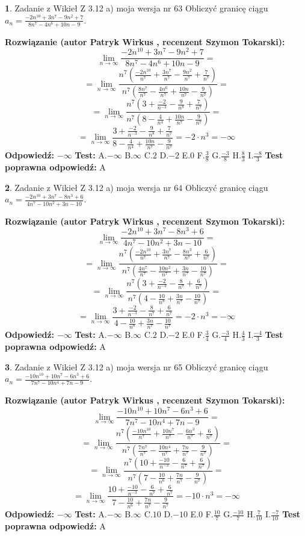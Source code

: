 \documentclass[12pt, a4paper]{article}
\theoremstyle{definition} %
\newtheorem{zad}{}
\newcommand{\zadStart}[1]{\begin{zad}#1\newline}
\newcommand{\zadStop}{\end{zad}}
\newcommand{\rozwStart}[2]{\noindent \textbf{Rozwiązanie (autor #1 , recenzent #2): }\newline}
\newcommand{\rozwStop}{\newline}
\newcommand{\odpStart}{\noindent \textbf{Odpowiedź:}\newline}
\newcommand{\odpStop}{\newline}
\newcommand{\testStart}{\noindent \textbf{Test:}\newline}
\newcommand{\testStop}{\newline}
\newcommand{\kluczStart}{\noindent \textbf{Test poprawna odpowiedź:}\newline}
\newcommand{\kluczStop}{\newline}
\begin{document}
\zadStart{Zadanie z Wikieł Z 3.12 a) moja wersja nr 63}
Obliczyć granicę ciągu $a_{n}=\frac{-2n^{10}+3n^{7}-9n^{2}+7}{8n^{7}-4n^{6}+10n-9}$.
\zadStop
\rozwStart{Patryk Wirkus}{Szymon Tokarski}
$$\lim\limits_{n\to\infty}\frac{-2n^{10}+3n^{7}-9n^{2}+7}{8n^{7}-4n^{6}+10n-9}=$$
$$=\lim\limits_{n\to\infty}\frac{n^{7}\left(\frac{-2n^{10}}{n^{7}}+\frac{3n^{7}}{n^{7}}-\frac{9n^{2}}{n^{7}}+\frac{7}{n^{7}}\right)}{n^{7}\left(\frac{8n^{7}}{n^{7}}-\frac{4n^{6}}{n^{7}}+\frac{10n}{n^{7}}-\frac{9}{n^{7}}\right)}=$$
$$=\lim\limits_{n\to\infty}\frac{n^{7}\left(3+\frac{-2}{n^{-3}}-\frac{9}{n^{8}}+\frac{7}{n^{7}}\right)}
{n^{7}\left(8-\frac{4}{n^{4}}+\frac{10n}{n^{7}}-\frac{9}{n^{7}}\right)}=$$
$$=\lim\limits_{n\to\infty}\frac{3+\frac{-2}{n^{-3}}-\frac{9}{n^{8}}+\frac{7}{n^{7}}}{8-\frac{4}{n^{4}}+\frac{10n}{n^{7}}-\frac{9}{n^{7}}}=-2\cdot n^{3} = -\infty$$
\rozwStop
\odpStart
$-\infty$
\odpStop
\testStart
A.$-\infty$
B.$\infty$
C.$2$
D.$-2$
E.$0$
F.$\frac{3}{8}$
G.$\frac{-3}{8}$
H.$\frac{8}{3}$
I.$\frac{-8}{3}$
\testStop
\kluczStart
A
\kluczStop



\zadStart{Zadanie z Wikieł Z 3.12 a) moja wersja nr 64}
Obliczyć granicę ciągu $a_{n}=\frac{-2n^{10}+3n^{7}-8n^{3}+6}{4n^{7}-10n^{2}+3n-10}$.
\zadStop
\rozwStart{Patryk Wirkus}{Szymon Tokarski}
$$\lim\limits_{n\to\infty}\frac{-2n^{10}+3n^{7}-8n^{3}+6}{4n^{7}-10n^{2}+3n-10}=$$
$$=\lim\limits_{n\to\infty}\frac{n^{7}\left(\frac{-2n^{10}}{n^{7}}+\frac{3n^{7}}{n^{7}}-\frac{8n^{3}}{n^{7}}+\frac{6}{n^{7}}\right)}{n^{7}\left(\frac{4n^{7}}{n^{7}}-\frac{10n^{2}}{n^{7}}+\frac{3n}{n^{7}}-\frac{10}{n^{7}}\right)}=$$
$$=\lim\limits_{n\to\infty}\frac{n^{7}\left(3+\frac{-2}{n^{-3}}-\frac{8}{n^{7}}+\frac{6}{n^{7}}\right)}
{n^{7}\left(4-\frac{10}{n^{8}}+\frac{3n}{n^{7}}-\frac{10}{n^{7}}\right)}=$$
$$=\lim\limits_{n\to\infty}\frac{3+\frac{-2}{n^{-3}}-\frac{8}{n^{7}}+\frac{6}{n^{7}}}{4-\frac{10}{n^{8}}+\frac{3n}{n^{7}}-\frac{10}{n^{7}}}=-2\cdot n^{3} = -\infty$$
\rozwStop
\odpStart
$-\infty$
\odpStop
\testStart
A.$-\infty$
B.$\infty$
C.$2$
D.$-2$
E.$0$
F.$\frac{3}{4}$
G.$\frac{-3}{4}$
H.$\frac{4}{3}$
I.$\frac{-4}{3}$
\testStop
\kluczStart
A
\kluczStop



\zadStart{Zadanie z Wikieł Z 3.12 a) moja wersja nr 65}
Obliczyć granicę ciągu $a_{n}=\frac{-10n^{10}+10n^{7}-6n^{3}+6}{7n^{7}-10n^{4}+7n-9}$.
\zadStop
\rozwStart{Patryk Wirkus}{Szymon Tokarski}
$$\lim\limits_{n\to\infty}\frac{-10n^{10}+10n^{7}-6n^{3}+6}{7n^{7}-10n^{4}+7n-9}=$$
$$=\lim\limits_{n\to\infty}\frac{n^{7}\left(\frac{-10n^{10}}{n^{7}}+\frac{10n^{7}}{n^{7}}-\frac{6n^{3}}{n^{7}}+\frac{6}{n^{7}}\right)}{n^{7}\left(\frac{7n^{7}}{n^{7}}-\frac{10n^{4}}{n^{7}}+\frac{7n}{n^{7}}-\frac{9}{n^{7}}\right)}=$$
$$=\lim\limits_{n\to\infty}\frac{n^{7}\left(10+\frac{-10}{n^{-3}}-\frac{6}{n^{7}}+\frac{6}{n^{7}}\right)}
{n^{7}\left(7-\frac{10}{n^{6}}+\frac{7n}{n^{7}}-\frac{9}{n^{7}}\right)}=$$
$$=\lim\limits_{n\to\infty}\frac{10+\frac{-10}{n^{-3}}-\frac{6}{n^{7}}+\frac{6}{n^{7}}}{7-\frac{10}{n^{6}}+\frac{7n}{n^{7}}-\frac{9}{n^{7}}}=-10\cdot n^{3} = -\infty$$
\rozwStop
\odpStart
$-\infty$
\odpStop
\testStart
A.$-\infty$
B.$\infty$
C.$10$
D.$-10$
E.$0$
F.$\frac{10}{7}$
G.$\frac{-10}{7}$
H.$\frac{7}{10}$
I.$\frac{-7}{10}$
\testStop
\kluczStart
A
\kluczStop
\end{document}
